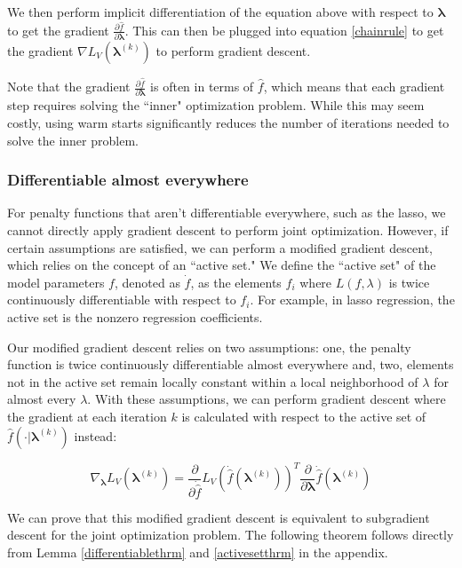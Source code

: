 \documentclass[10pt,letterpaper]{article}
\begin{document}
We then perform implicit differentiation of the equation above with respect to $\boldsymbol{\lambda}$ to get the gradient $\frac{\partial \hat f}{\partial \boldsymbol{\lambda}}$. This can then be plugged into equation \ref{chainrule} to get the gradient $\nabla{L_V}(\boldsymbol{\lambda}^{(k)})$ to perform gradient descent.

Note that the gradient $\frac{\partial \hat f}{\partial \boldsymbol{\lambda}}$ is often in terms of $\hat f$, which means that each gradient step requires solving the ``inner" optimization problem. While this may seem costly, using warm starts significantly reduces the number of iterations needed to solve the inner problem.

\subsubsection{Differentiable almost everywhere}

For penalty functions that aren't differentiable everywhere, such as the lasso, we cannot directly apply gradient descent to perform joint optimization. However, if certain assumptions are satisfied, we can perform a modified gradient descent, which relies on the concept of an ``active set." We define the ``active set" of the model parameters $f$, denoted as $\dot f$, as the elements $f_i$ where $L(f, \lambda)$ is twice continuously differentiable with respect to $f_i$. For example, in lasso regression, the active set is the nonzero regression coefficients.

Our modified gradient descent relies on two assumptions: one, the penalty function is twice continuously differentiable almost everywhere and, two, elements not in the active set remain locally constant within a local neighborhood of $\lambda$ for almost every $\lambda$. With these assumptions, we can perform gradient descent where the gradient at each iteration $k$ is calculated with respect to the active set of $\hat f(\cdot | \boldsymbol{\lambda}^{(k)})$ instead:

\begin{equation}
\nabla_{\boldsymbol{\lambda}} L_V(\boldsymbol{\lambda}^{(k)}) = \frac{\partial}{\partial \dot{\hat{f}}} L_V(\dot{\hat{f}}(\boldsymbol{\lambda}^{(k)}))^T \frac{\partial}{\partial \boldsymbol{\lambda}} \dot{\hat{f}}(\boldsymbol{\lambda}^{(k)})
\end{equation}

We can prove that this modified gradient descent is equivalent to subgradient descent for the joint optimization problem. The following theorem follows directly from Lemma \ref{differentiablethrm} and \ref{activesetthrm} in the appendix.
\end{document}
